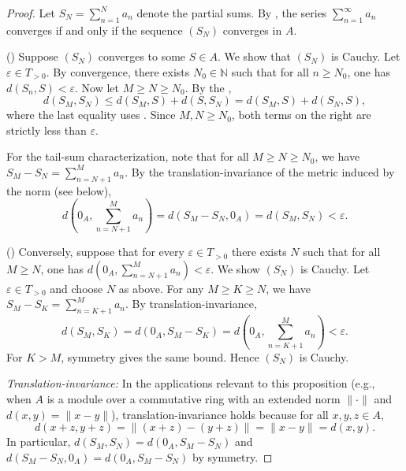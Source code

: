 \begin{proof}
    Let $S_N = \sum_{n=1}^N a_n$ denote the partial sums. By , the series $\sum_{n=1}^\infty a_n$ converges if and only if the sequence $(S_N)$ converges in $A$.

    (\Rightarrow) Suppose $(S_N)$ converges to some $S \in A$. We show that $(S_N)$ is Cauchy. Let $\varepsilon \in T_{>0}$. By convergence, there exists $N_0 \in \mathbb{N}$ such that for all $n \geq N_0$, one has $d(S_n, S) < \varepsilon$. Now let $M \geq N \geq N_0$. By the ,
    $$d(S_M, S_N) \leq d(S_M, S) + d(S, S_N) = d(S_M, S) + d(S_N, S),$$
    where the last equality uses . Since $M, N \geq N_0$, both terms on the right are strictly less than $\varepsilon$.

    For the tail-sum characterization, note that for all $M \geq N \geq N_0$, we have $S_M - S_N = \sum_{n=N+1}^M a_n$. By the translation-invariance of the metric induced by the norm (see below),
    $$d\left(0_A, \sum_{n=N+1}^M a_n\right) = d(S_M - S_N, 0_A) = d(S_M, S_N) < \varepsilon.$$

    (\Leftarrow) Conversely, suppose that for every $\varepsilon \in T_{>0}$ there exists $N$ such that for all $M \geq N$, one has $d(0_A, \sum_{n=N+1}^M a_n) < \varepsilon$. We show $(S_N)$ is Cauchy. Let $\varepsilon \in T_{>0}$ and choose $N$ as above. For any $M \geq K \geq N$, we have $S_M - S_K = \sum_{n=K+1}^M a_n$. By translation-invariance,
    $$d(S_M, S_K) = d(0_A, S_M - S_K) = d\left(0_A, \sum_{n=K+1}^M a_n\right) < \varepsilon.$$
    For $K > M$, symmetry gives the same bound. Hence $(S_N)$ is Cauchy.

    \emph{Translation-invariance:} In the applications relevant to this proposition (e.g., when $A$ is a module over a commutative ring with an extended norm $\|\cdot\|$ and $d(x,y) = \|x-y\|$), translation-invariance holds because for all $x, y, z \in A$,
    $$d(x+z, y+z) = \|(x+z) - (y+z)\| = \|x - y\| = d(x,y).$$
    In particular, $d(S_M, S_N) = d(0_A, S_M - S_N)$ and $d(S_M - S_N, 0_A) = d(0_A, S_M - S_N)$ by symmetry.
\end{proof}
